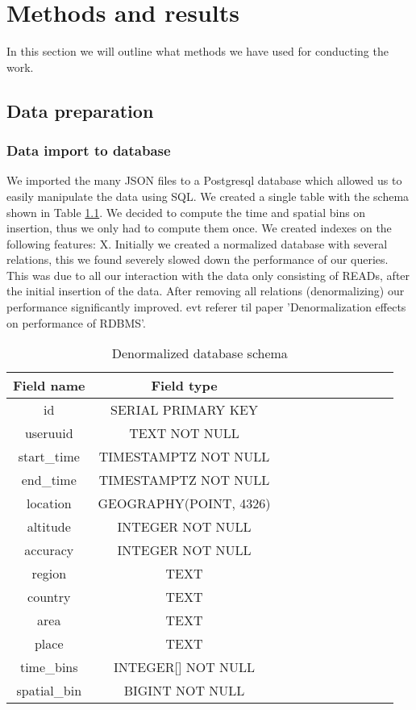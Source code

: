 \chapter{Methods and results}
In this section we will outline what methods we have used for conducting the work.
\section{Data preparation}
\subsection{Data import to database}
We imported the many JSON files to a Postgresql database which allowed us to easily manipulate the data using SQL. We created a single table with the schema shown in Table \ref{table:schema_denormalized}. We decided to compute the time and spatial bins on insertion, thus we only had to compute them once. We created indexes on the following features: X.
Initially we created a normalized database with several relations, this we found severely slowed down the performance of our queries. This was due to all our interaction with the data only consisting of READs, after the initial insertion of the data. After removing all relations (denormalizing) our performance significantly improved. {\color{red} evt referer til paper 'Denormalization effects on performance of RDBMS'}.
\begin{table}[htbp]
\centering

\begin{tabular}{|c|c|c|c|c|c|c|c|c|c|c|}
\hline
\textbf{Field name} & \textbf{Field type}    \\
\hline
id                  & SERIAL PRIMARY KEY     \\
\hline
useruuid            & TEXT NOT NULL          \\
\hline
start\_time         & TIMESTAMPTZ NOT NULL   \\
\hline
end\_time           & TIMESTAMPTZ NOT NULL   \\
\hline
location            & GEOGRAPHY(POINT, 4326) \\
\hline
altitude            & INTEGER NOT NULL       \\
\hline
accuracy            & INTEGER NOT NULL       \\
\hline
region              & TEXT                   \\
\hline
country             & TEXT                   \\
\hline
area                & TEXT                   \\
\hline
place               & TEXT                   \\
\hline
time\_bins          & INTEGER{[}{]} NOT NULL \\
\hline
spatial\_bin        & BIGINT NOT NULL        \\
\hline
\end{tabular}
\caption{Denormalized database schema}
\label{table:schema_denormalized}
\end{table}

